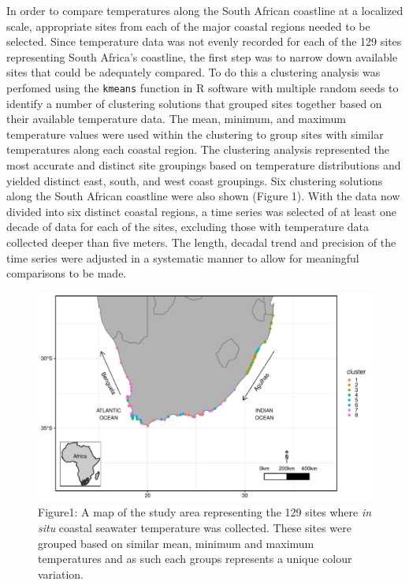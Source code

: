 \documentclass[12pt,A4paper,]{article}
\begin{document}
In order to compare temperatures along the South African coastline at a
localized scale, appropriate sites from each of the major coastal
regions needed to be selected. Since temperature data was not evenly
recorded for each of the 129 sites representing South Africa's
coastline, the first step was to narrow down available sites that could
be adequately compared. To do this a clustering analysis was perfomed
using the \texttt{kmeans} function in R software with multiple random
seeds to identify a number of clustering solutions that grouped sites
together based on their available temperature data. The mean, minimum,
and maximum temperature values were used within the clustering to group
sites with similar temperatures along each coastal region. The
clustering analysis represented the most accurate and distinct site
groupings based on temperature distributions and yielded distinct east,
south, and west coast groupings. Six clustering solutions along the
South African coastline were also shown (Figure 1). With the data now
divided into six distinct coastal regions, a time series was selected of
at least one decade of data for each of the sites, excluding those with
temperature data collected deeper than five meters. The length, decadal
trend and precision of the time series were adjusted in a systematic
manner to allow for meaningful comparisons to be made.

\begin{figure}
\centering
\includegraphics{../figures/map_fixed.pdf}
\caption{Figure1: A map of the study area representing the 129 sites
where \emph{in situ} coastal seawater temperature was collected. These
sites were grouped based on similar mean, minimum and maximum
temperatures and as such each groups represents a unique colour
variation.}
\end{figure}
\end{document}

